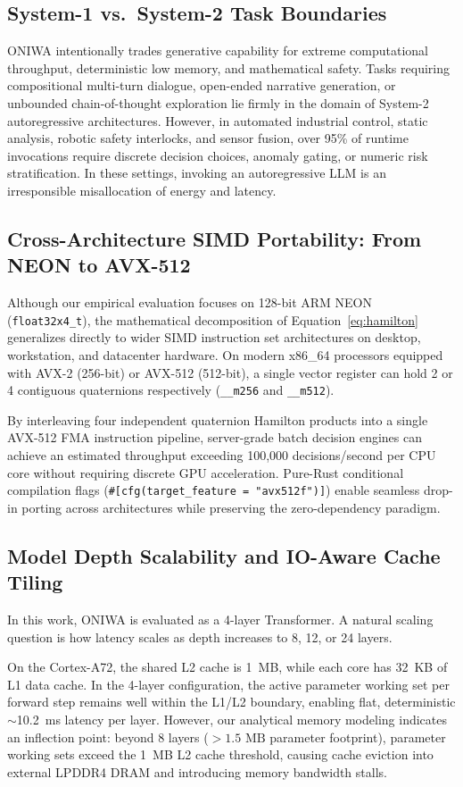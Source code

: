 \documentclass[10pt,twocolumn,letterpaper]{article}
\begin{document}
\subsection{System-1 vs.\ System-2 Task Boundaries}
ONIWA intentionally trades generative capability for extreme computational throughput, deterministic low memory, and mathematical safety. Tasks requiring compositional multi-turn dialogue, open-ended narrative generation, or unbounded chain-of-thought exploration lie firmly in the domain of System-2 autoregressive architectures. However, in automated industrial control, static analysis, robotic safety interlocks, and sensor fusion, over 95\% of runtime invocations require discrete decision choices, anomaly gating, or numeric risk stratification. In these settings, invoking an autoregressive LLM is an irresponsible misallocation of energy and latency.

\subsection{Cross-Architecture SIMD Portability: From NEON to AVX-512}
Although our empirical evaluation focuses on 128-bit ARM NEON (\texttt{float32x4\_t}), the mathematical decomposition of Equation~\ref{eq:hamilton} generalizes directly to wider SIMD instruction set architectures on desktop, workstation, and datacenter hardware. On modern x86\_64 processors equipped with AVX-2 (256-bit) or AVX-512 (512-bit), a single vector register can hold 2 or 4 contiguous quaternions respectively (\texttt{\_\_m256} and \texttt{\_\_m512}). 

By interleaving four independent quaternion Hamilton products into a single AVX-512 FMA instruction pipeline, server-grade batch decision engines can achieve an estimated throughput exceeding 100,000 decisions/second per CPU core without requiring discrete GPU acceleration. Pure-Rust conditional compilation flags (\texttt{\#[cfg(target\_feature = "avx512f")]}) enable seamless drop-in porting across architectures while preserving the zero-dependency paradigm.

\subsection{Model Depth Scalability and IO-Aware Cache Tiling}
In this work, ONIWA is evaluated as a 4-layer Transformer. A natural scaling question is how latency scales as depth increases to 8, 12, or 24 layers. 

On the Cortex-A72, the shared L2 cache is 1~MB, while each core has 32~KB of L1 data cache. In the 4-layer configuration, the active parameter working set per forward step remains well within the L1/L2 boundary, enabling flat, deterministic $\sim$10.2~ms latency per layer. However, our analytical memory modeling indicates an inflection point: beyond 8 layers ($>1.5\text{ MB}$ parameter footprint), parameter working sets exceed the 1~MB L2 cache threshold, causing cache eviction into external LPDDR4 DRAM and introducing memory bandwidth stalls. 
\end{document}
